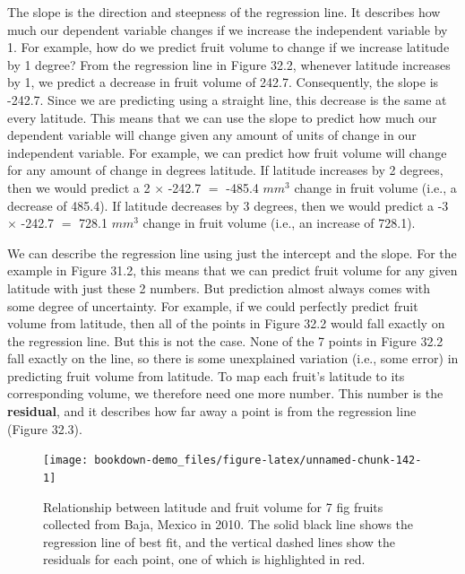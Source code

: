 \documentclass[
  openany]{scrbook}
\begin{document}
The slope is the direction and steepness of the regression line.
It describes how much our dependent variable changes if we increase the independent variable by 1.
For example, how do we predict fruit volume to change if we increase latitude by 1 degree?
From the regression line in Figure 32.2, whenever latitude increases by 1, we predict a decrease in fruit volume of 242.7.
Consequently, the slope is -242.7.
Since we are predicting using a straight line, this decrease is the same at every latitude.
This means that we can use the slope to predict how much our dependent variable will change given any amount of units of change in our independent variable.
For example, we can predict how fruit volume will change for any amount of change in degrees latitude.
If latitude increases by 2 degrees, then we would predict a 2 \(\times\) -242.7 \(=\) -485.4 \(mm^{3}\) change in fruit volume (i.e., a decrease of 485.4).
If latitude decreases by 3 degrees, then we would predict a -3 \(\times\) -242.7 \(=\) 728.1 \(mm^{3}\) change in fruit volume (i.e., an increase of 728.1).

We can describe the regression line using just the intercept and the slope.
For the example in Figure 31.2, this means that we can predict fruit volume for any given latitude with just these 2 numbers.
But prediction almost always comes with some degree of uncertainty.
For example, if we could perfectly predict fruit volume from latitude, then all of the points in Figure 32.2 would fall exactly on the regression line.
But this is not the case.
None of the 7 points in Figure 32.2 fall exactly on the line, so there is some unexplained variation (i.e., some error) in predicting fruit volume from latitude.
To map each fruit's latitude to its corresponding volume, we therefore need one more number.
This number is the \textbf{residual}, and it describes how far away a point is from the regression line (Figure 32.3).

\begin{figure}
\texttt{[image: bookdown-demo\_files/figure-latex/unnamed-chunk-142-1]} \caption{Relationship between latitude and fruit volume for 7 fig fruits collected from Baja, Mexico in 2010. The solid black line shows the regression line of best fit, and the vertical dashed lines show the residuals for each point, one of which is highlighted in red.}\label{fig:unnamed-chunk-142}
\end{figure}
\end{document}
